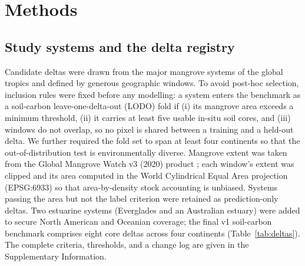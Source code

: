 \documentclass[twocolumn,9pt]{extarticle}
\begin{document}
\section*{Methods}

\subsection*{Study systems and the delta registry}
Candidate deltas were drawn from the major mangrove systems of the global tropics and
defined by generous geographic windows. To avoid post-hoc selection, inclusion rules
were fixed before any modelling: a system enters the benchmark as a soil-carbon
leave-one-delta-out (LODO) fold if (i) its mangrove area exceeds a minimum threshold,
(ii) it carries at least five usable in-situ soil cores, and (iii) windows do not
overlap, so no pixel is shared between a training and a held-out delta. We further
required the fold set to span at least four continents so that the out-of-distribution
test is environmentally diverse. Mangrove extent was taken from the Global Mangrove
Watch v3 (2020) product \cite{bunting2022gmw3}; each window's extent was clipped and
its area computed in the World Cylindrical Equal Area projection (EPSG:6933) so that
area-by-density stock accounting is unbiased. Systems passing the area but not the
label criterion were retained as prediction-only deltas. Two estuarine systems
(Everglades and an Australian estuary) were added to secure North American and
Oceanian coverage; the final v1 soil-carbon benchmark comprises eight core deltas
across four continents (Table~\ref{tab:deltas}). The complete criteria, thresholds,
and a change log are given in the Supplementary Information.
\end{document}
